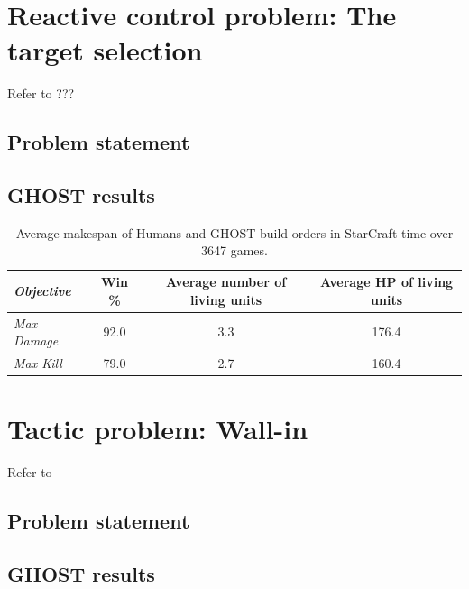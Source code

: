 \documentclass[journal]{IEEEtran}
\newcommand{\ghost}{\textsc{GHOST}\xspace}
\begin{document}
\section{Reactive control problem: The target selection}\label{sec:target}
Refer to ???
\subsection{Problem statement}
\subsection{\ghost results}

\begin{table}[tba]
  \label{tbl:target}
  \centering
  \caption{Average makespan of Humans and \ghost build orders in StarCraft time over 3647
    games.}
  \begin{tabular}{|l|c|c|c|} 
    \hline
    {\em Objective} & Win \% & Average number of living units & Average HP of living units\\
    \hline
    {\em Max Damage} & 92.0 & 3.3 & 176.4\\
    {\em Max Kill} & 79.0 & 2.7 & 160.4\\
    \hline
  \end{tabular}
\end{table}


\section{Tactic problem: Wall-in}\label{sec:wall}
Refer to \cite{Certicky13, RichouxUO14}
\subsection{Problem statement}
\subsection{\ghost results}
\end{document}
